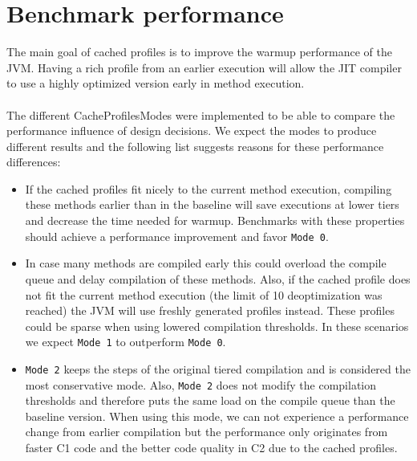 \section{Benchmark performance}
\label{s:perf_benchmark}
The main goal of cached profiles is to improve the warmup performance of the JVM. Having a rich profile from an earlier execution will allow the JIT compiler to use a highly optimized version early in method execution.
\\\\
The different CacheProfilesModes were implemented to be able to compare the performance influence of design decisions. We expect the modes to produce different results and the following list suggests reasons for these performance differences:
\begin{itemize}
  \item If the cached profiles fit nicely to the current method execution, compiling these methods earlier than in the baseline will save executions at lower tiers and decrease the time needed for warmup. Benchmarks with these properties should achieve a performance improvement and favor \texttt{Mode 0}.
  \item In case many methods are compiled early this could overload the compile queue and delay compilation of these methods. Also, if the cached profile does not fit the current method execution (the limit of 10 deoptimization was reached) the JVM will use freshly generated profiles instead. These profiles could be sparse when using lowered compilation thresholds. In these scenarios we expect \texttt{Mode 1} to outperform \texttt{Mode 0}.
  \item \texttt{Mode 2} keeps the steps of the original tiered compilation and is considered the most conservative mode. Also, \texttt{Mode 2} does not modify the compilation thresholds and therefore puts the same load on the compile queue than the baseline version. When using this mode, we can not experience a performance change from earlier compilation but the performance only originates from faster C1 code and the better code quality in C2 due to the cached profiles.
\end{itemize}
